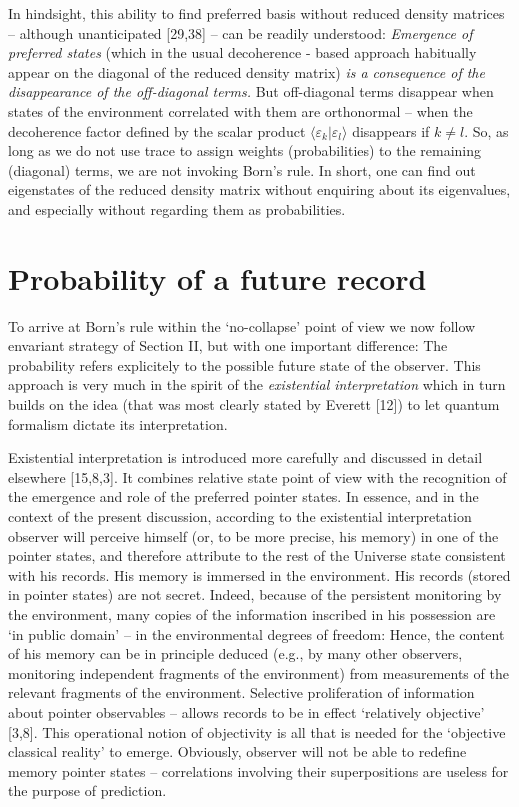 \documentclass[aps,twocolumn,pra,epsfig]{revtex4}
\begin{document}
In hindsight, this ability to find preferred basis without reduced density
matrices -- although unanticipated [29,38] -- can be readily understood:
{\it Emergence of preferred states} (which in the usual
decoherence - based approach habitually appear on the diagonal of the reduced
density matrix) {\it is a consequence of the disappearance of the off-diagonal
terms.} But off-diagonal terms disappear when states of the environment
correlated with them are orthonormal -- when the decoherence factor defined
by the scalar product $\langle\varepsilon_k|\varepsilon_l\rangle$ disappears
if $k\neq l$. So, as long as we do not use trace to assign weights
(probabilities) to the remaining (diagonal) terms, we are not invoking Born's
rule. In short, one can find out eigenstates of the reduced density matrix
without enquiring about its eigenvalues, and especially without regarding them
as probabilities.

\section{Probability of a future record}

To arrive at Born's rule within the `no-collapse' point of view we now follow
envariant strategy of Section II, but with one important difference: The probability
refers explicitely to the possible future state of the observer. This
approach is very much in the spirit of the {\it existential interpretation}
which in turn builds on the idea (that was most clearly stated by Everett
[12]) to let quantum formalism dictate its interpretation.

Existential interpretation is introduced more carefully and discussed
in detail elsewhere [15,8,3]. It combines relative state point of view with
the recognition of the emergence and role of the preferred pointer states.
In essence, and in the context of the present discussion, according to
the existential interpretation observer will perceive himself (or, to be more
precise, his memory) in one of the pointer states, and therefore attribute
to the rest of the Universe state consistent with his records. His memory
is immersed in the environment. His records (stored in pointer states) are 
not secret. Indeed, because of the persistent monitoring by the environment, 
many copies of the information inscribed in his possession are `in public
domain' -- in the environmental degrees of freedom: Hence, the content of his
memory can be in principle deduced (e.g., by many other observers, monitoring
independent fragments of the environment) from measurements of the relevant
fragments of the environment. Selective proliferation 
of information about pointer observables -- allows records to be in effect
`relatively objective' [3,8]. This operational notion of objectivity is all
that is needed for the `objective classical reality' to emerge. Obviously,
observer will not be able to redefine memory pointer states -- correlations
involving their superpositions are useless for the purpose of prediction.
\end{document}
